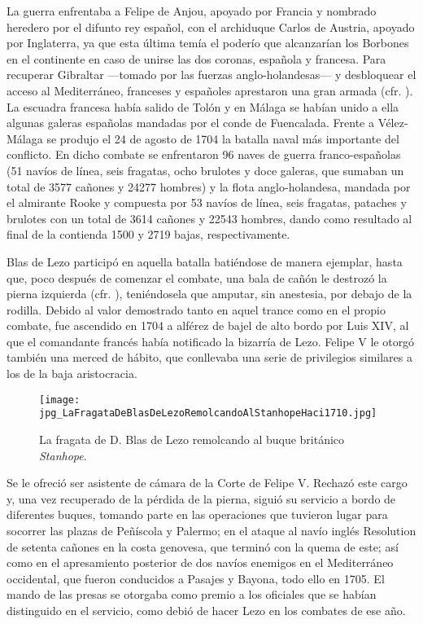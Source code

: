 
La guerra enfrentaba a Felipe de Anjou, apoyado por Francia y nombrado
heredero por el difunto rey español, con el archiduque Carlos de
Austria, apoyado por Inglaterra, ya que esta última temía el poderío
que alcanzarían los Borbones en el continente en caso de unirse las
dos coronas, española y francesa. Para recuperar
Gibraltar ---tomado
por las fuerzas anglo-holandesas--- y desbloquear el acceso al
Mediterráneo, franceses y españoles aprestaron una gran armada
(cfr. \cite{qui01,garciarivas}). La escuadra francesa había salido de
Tolón y en Málaga se habían unido a ella algunas galeras españolas
mandadas por el conde de Fuencalada. Frente a Vélez-Málaga se produjo
el 24 de agosto de 1704 la batalla naval más importante del
conflicto. En dicho combate se enfrentaron 96 naves de guerra
franco-españolas (51 navíos de línea, seis fragatas, ocho brulotes y
doce galeras, que sumaban un total de 3577 cañones y 24277 hombres) y
la flota anglo-holandesa, mandada por el almirante Rooke y compuesta
por 53 navíos de línea, seis fragatas, pataches y brulotes con un
total de 3614 cañones y 22543 hombres, dando como resultado al final
de la contienda 1500 y 2719 bajas, respectivamente.

Blas de Lezo participó en aquella batalla batiéndose de manera
ejemplar, hasta que, poco después de comenzar el
combate, una bala de cañón le destrozó la pierna izquierda
(cfr. \cite{qui01}), teniéndosela que amputar, sin anestesia, por
debajo de la rodilla. Debido al valor demostrado tanto en aquel trance
como en el propio combate, fue ascendido en 1704 a alférez de bajel de
alto bordo por Luis XIV, al que el comandante francés había notificado
la bizarría de Lezo. Felipe V le otorgó también una merced de hábito,
que conllevaba una serie de privilegios similares a los de la baja
aristocracia.

\begin{figure}[!hbp]
\centering
\texttt{[image: jpg\_LaFragataDeBlasDeLezoRemolcandoAlStanhopeHaci1710.jpg]}
\caption{\label{fig:fragata} La fragata de D. Blas de Lezo remolcando
al buque británico \textit{Stanhope}.}
\end{figure}

Se le ofreció ser asistente de cámara de la Corte de Felipe V. Rechazó
este cargo y, una vez recuperado de la pérdida de la pierna, siguió su
servicio a bordo de diferentes buques, tomando parte en las
operaciones que tuvieron lugar para socorrer las plazas de Peñíscola y
Palermo; en el ataque al navío inglés Resolution de setenta cañones en
la costa genovesa, que terminó con la quema de este; así como en el
apresamiento posterior de dos navíos enemigos en el Mediterráneo
occidental, que fueron conducidos a Pasajes y Bayona, todo ello en
1705. El mando de las presas se otorgaba como premio a los oficiales
que se habían distinguido en el servicio, como debió de hacer Lezo en
los combates de ese año.

